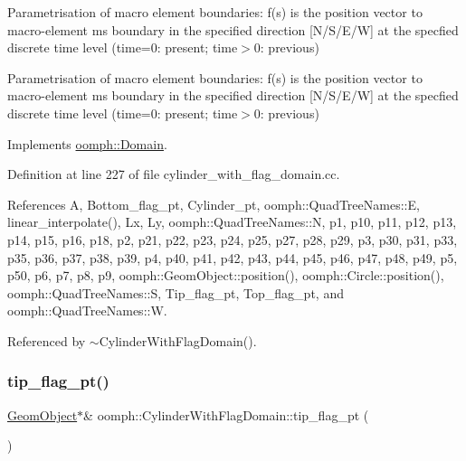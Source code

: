 Parametrisation of macro element boundaries\+: f(s) is the position vector to macro-\/element m\textquotesingle{}s boundary in the specified direction \mbox{[}N/\+S/\+E/W\mbox{]} at the specfied discrete time level (time=0\+: present; time$>$0\+: previous) 

Parametrisation of macro element boundaries\+: f(s) is the position vector to macro-\/element m\textquotesingle{}s boundary in the specified direction \mbox{[}N/\+S/\+E/W\mbox{]} at the specfied discrete time level (time=0\+: present; time$>$0\+: previous) 

Implements \hyperlink{classoomph_1_1Domain_a95f3e00d28ea37e6c4d3027bfac91096}{oomph\+::\+Domain}.



Definition at line 227 of file cylinder\+\_\+with\+\_\+flag\+\_\+domain.\+cc.



References A, Bottom\+\_\+flag\+\_\+pt, Cylinder\+\_\+pt, oomph\+::\+Quad\+Tree\+Names\+::E, linear\+\_\+interpolate(), Lx, Ly, oomph\+::\+Quad\+Tree\+Names\+::N, p1, p10, p11, p12, p13, p14, p15, p16, p18, p2, p21, p22, p23, p24, p25, p27, p28, p29, p3, p30, p31, p33, p35, p36, p37, p38, p39, p4, p40, p41, p42, p43, p44, p45, p46, p47, p48, p49, p5, p50, p6, p7, p8, p9, oomph\+::\+Geom\+Object\+::position(), oomph\+::\+Circle\+::position(), oomph\+::\+Quad\+Tree\+Names\+::S, Tip\+\_\+flag\+\_\+pt, Top\+\_\+flag\+\_\+pt, and oomph\+::\+Quad\+Tree\+Names\+::W.



Referenced by $\sim$\+Cylinder\+With\+Flag\+Domain().

\mbox{\label{classoomph_1_1CylinderWithFlagDomain_a9977cf9b4b71f83ba0f4d253164d4e00}} 
\subsubsection{\texorpdfstring{tip\+\_\+flag\+\_\+pt()}{tip\_flag\_pt()}}
{\footnotesize\ttfamily \hyperlink{classoomph_1_1GeomObject}{Geom\+Object}$\ast$\& oomph\+::\+Cylinder\+With\+Flag\+Domain\+::tip\+\_\+flag\+\_\+pt (\begin{DoxyParamCaption}{ }\end{DoxyParamCaption})\hspace{0.3cm}{\ttfamily [inline]}}



